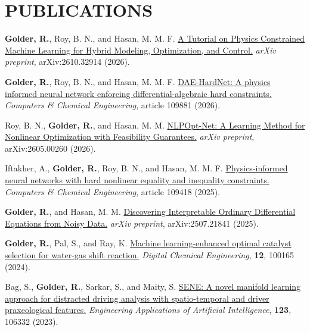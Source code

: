 \documentclass[11pt,letterpaper,sans]{moderncv}
\newlength{\cvcontentindent}
\newcommand{\cvsection}[1]{\par\Needspace{3\baselineskip}\vspace{-0.3em}\section{#1}\vspace{-0.25em}}
\begin{document}
\cvsection{PUBLICATIONS}
\par{}\vspace{0.10em}{\small\itshape\textcolor{cvsoft}{Journal Articles}}\par\vspace{0.16em}
\begin{list}{}{\setlength{\leftmargin}{\cvcontentindent}\setlength{\labelwidth}{0pt}\setlength{\labelsep}{0pt}\setlength{\itemsep}{0.25em}\setlength{\parsep}{0pt}\setlength{\topsep}{0.05em}}\small
\item \textbf{Golder, R.}, Roy, B. N., and Hasan, M. M. F. \href{https://arxiv.org/abs/2610.32914}{A Tutorial on Physics Constrained Machine Learning for Hybrid Modeling, Optimization, and Control.} \textit{arXiv preprint}, arXiv:2610.32914 (2026).
\item \textbf{Golder, R.}, Roy, B. N., and Hasan, M. M. F. \href{https://www.sciencedirect.com/science/article/pii/S0098135426003339}{DAE-HardNet: A physics informed neural network enforcing differential-algebraic hard constraints.} \textit{Computers \& Chemical Engineering}, article 109881 (2026).
\item Roy, B. N., \textbf{Golder, R.}, and Hasan, M. M. \href{https://arxiv.org/abs/2605.00260}{NLPOpt-Net: A Learning Method for Nonlinear Optimization with Feasibility Guarantees.} \textit{arXiv preprint}, arXiv:2605.00260 (2026).
\item Iftakher, A., \textbf{Golder, R.}, Roy, B. N., and Hasan, M. M. F. \href{https://www.sciencedirect.com/science/article/pii/S0098135425004211}{Physics-informed neural networks with hard nonlinear equality and inequality constraints.} \textit{Computers \& Chemical Engineering}, article 109418 (2025).
\item \textbf{Golder, R.}, and Hasan, M. M. \href{https://arxiv.org/abs/2507.21841}{Discovering Interpretable Ordinary Differential Equations from Noisy Data.} \textit{arXiv preprint}, arXiv:2507.21841 (2025).
\item \textbf{Golder, R.}, Pal, S., and Ray, K. \href{https://www.sciencedirect.com/science/article/pii/S2772508124000279}{Machine learning-enhanced optimal catalyst selection for water-gas shift reaction.} \textit{Digital Chemical Engineering}, \textbf{12}, 100165 (2024).
\item Bag, S., \textbf{Golder, R.}, Sarkar, S., and Maity, S. \href{https://doi.org/10.1016/j.engappai.2023.106332}{SENE: A novel manifold learning approach for distracted driving analysis with spatio-temporal and driver praxeological features.} \textit{Engineering Applications of Artificial Intelligence}, \textbf{123}, 106332 (2023).
\end{list}
\end{document}
